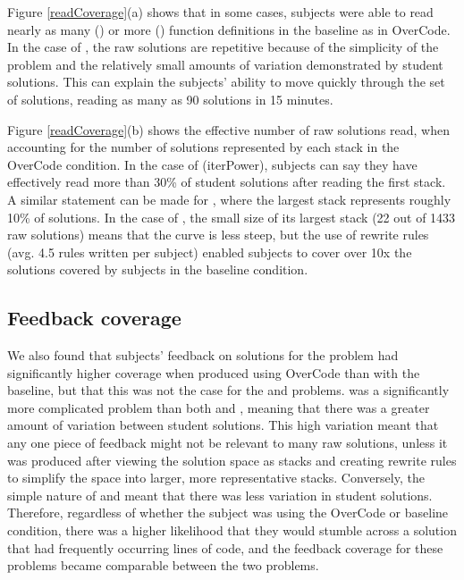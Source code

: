 Figure \ref{readCoverage}(a) shows that in some cases, subjects were able to read nearly as many () or more () function definitions in the baseline as in OverCode. In the case of , the raw solutions are repetitive because of the simplicity of the problem and the relatively small amounts of variation demonstrated by student solutions. This can explain the subjects' ability to move quickly through the set of solutions, reading as many as 90 solutions in 15 minutes.

Figure \ref{readCoverage}(b) shows the effective number of raw solutions read, when accounting for the number of solutions represented by each stack in the OverCode condition. In the case of \codevar(iterPower), subjects can say they have effectively read more than 30\% of student solutions after reading the first stack. A similar statement can be made for , where the largest stack represents roughly 10\% of solutions. In the case of , the small size of its largest stack (22 out of 1433 raw solutions) means that the curve is less steep, but the use of rewrite rules (avg. 4.5 rules written per  subject) enabled subjects to cover over 10x the solutions covered by subjects in the baseline condition.

\subsection{Feedback coverage}
We also found that subjects' feedback on solutions for the  problem had significantly higher coverage when produced using OverCode than with the baseline, but that this was not the case for the  and  problems.  was a significantly more complicated problem than both  and , meaning that there was a greater amount of variation between student solutions. This high variation meant that any one piece of feedback might not be relevant to many raw solutions, unless it was produced after viewing the solution space as stacks and creating rewrite rules to simplify the space into larger, more representative stacks. Conversely, the simple nature of  and  meant that there was less variation in student solutions. Therefore, regardless of whether the subject was using the OverCode or baseline condition, there was a higher likelihood that they would stumble across a solution that had frequently occurring lines of code, and the feedback coverage for these problems became comparable between the two problems.

